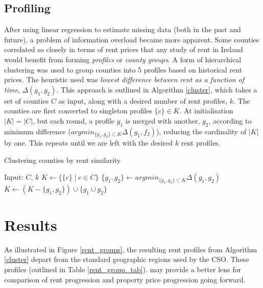 \documentclass[twocolumn]{article}
\begin{document}
\subsection{Profiling\label{ss:profiling}}

After using linear regression to estimate missing data (both in the past
and future), a problem of information overload became more apparent.
Some counties correlated so closely in terms of rent prices that any study
of rent in Ireland would benefit from forming {\it profiles} or {\it county
groups}.  A form of hierarchical clustering was used to group counties
into 5 profiles based on historical rent prices.  The heuristic used was
{\it lowest difference between rent as a function of time}, $\Delta(g_1, g_2)$.
This approach is outlined in Algorithm \ref{cluster},  which takes a set of
counties $C$ as input, along with a desired number of rent profiles, $k$.  The
counties are first converted to singleton profiles $\{c\} \in K$.  At
initialisation $|K| = |C|$, but each round, a profile $g_1$ is merged with
another, $g_2$, according to minimum difference
($argmin_{\{g_1, g_2\} \subset K}\Delta(g_1, f_2)$), reducing the cardinality
of $|K|$ by one.  This repeats until we are left with the desired $k$ rent
profiles.

\begin{algorithm}
\caption{Clustering counties by rent similarity\label{cluster}}
\begin{algorithmic}[1]
    \State Input: $C$, $k$
    \State $K \leftarrow \{\{c\} \mid c \in C\}$
    \State \{$g_1, g_2\} \leftarrow argmin_{\{g_1, g_2\} \subset K}\Delta(g_1, g_2)$
    \State $K \leftarrow (K - \{g_1, g_2\}) \cup \{g_1 \cup g_2\}$
    \EndWhile
\end{algorithmic}
\end{algorithm}

\section{Results}

As illustrated in Figure \ref{rent_groups}, the resulting rent profiles from
Algorithm \ref{cluster} depart from the standard geographic regions used by the
CSO.  These profiles (outlined in Table \ref{rent_group_tab}).  may provide a
better lens for comparison of rent progression and property price progression
going forward.
\end{document}
